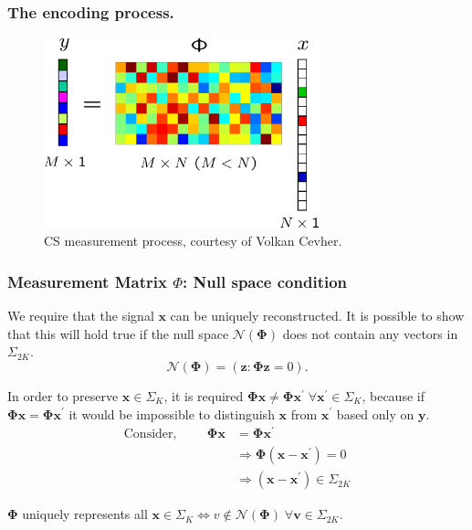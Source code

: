 \documentclass{beamer}
\begin{document}
\begin{frame}
\frametitle{The encoding process.} %
\begin{figure}[h]
        \centering
        \includegraphics[width = 8cm]{csss}
        \caption{CS measurement process, courtesy of Volkan Cevher.}
      \end{figure}
\end{frame}

\begin{frame}
  \frametitle{ Measurement Matrix $\Phi$: Null space condition}
We require that the signal $\boldsymbol{x}$ can be uniquely reconstructed. It is possible to show that this will hold true if the null space $\mathcal{N}(\boldsymbol{\Phi})$ does not contain any vectors in $\Sigma_{2K}$. 
\begin{equation*}
  \mathcal{N}(\boldsymbol{\Phi}) = (\boldsymbol{z}:\boldsymbol{\Phi}\boldsymbol{z}=0). 
\end{equation*}

In order to preserve $\boldsymbol{x} \in \Sigma_K$, it is required $\boldsymbol{\Phi x} \neq \boldsymbol{\Phi x^{\prime}} \; \forall  \boldsymbol{x^{\prime}} \in \Sigma_K$, because  if $\boldsymbol{\Phi x} = \boldsymbol{\Phi x^{\prime}}$ it would be impossible to distinguish $\boldsymbol{x}$ from $\boldsymbol{x^{\prime}}$ based only on $\boldsymbol{y}$. 
\begin{align*}
   \text{Consider,} \hspace{1cm} \boldsymbol{\Phi x} &= \boldsymbol{\Phi x^{\prime}} \\
& \Rightarrow \boldsymbol{\Phi}(\boldsymbol{x} - \boldsymbol{x^{\prime}}) = 0\\
&\Rightarrow (\boldsymbol{x} - \boldsymbol{x^{\prime}}) \in \Sigma_{2K}
\end{align*}

$\boldsymbol{\Phi}$ uniquely represents all $\boldsymbol{x} \in \Sigma_K \iff v \notin \mathcal{N}( \boldsymbol{\Phi}) \; \forall \boldsymbol{v} \in \Sigma_{2K}$. 
\end{frame}
\end{document}
